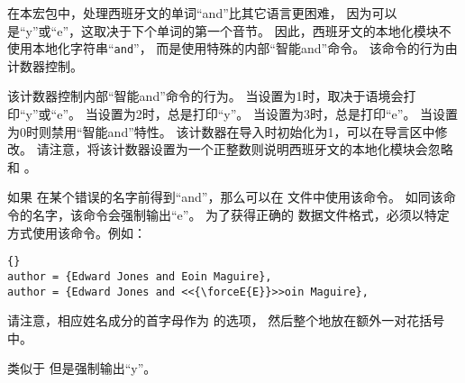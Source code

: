 
在本宏包中，处理西班牙文的单词“and”比其它语言更困难，
因为可以是“y”或“e”，这取决于下个单词的第一个音节。
因此，西班牙文的本地化模块不使用本地化字符串“\texttt{and}”，
而是使用特殊的内部“智能and”命令。
该命令的行为由  计数器控制。

\begin{ltxsyntax}



该计数器控制内部“智能and”命令的行为。
当设置为1时，取决于语境会打印“y”或“e”。
当设置为2时，总是打印“y”。
当设置为3时，总是打印“e”。
当设置为0时则禁用“智能and”特性。
该计数器在导入时初始化为1，可以在导言区中修改。
请注意，将该计数器设置为一个正整数则说明西班牙文的本地化模块会忽略  和 。



如果 \biblatex 在某个错误的名字前得到“and”，那么可以在  文件中使用该命令。
如同该命令的名字，该命令会强制输出“e”。
为了获得正确的 \BibTeX 数据文件格式，必须以特定方式使用该命令。例如：

\begin{lstlisting}[style=bibtex]{}
author = {Edward Jones and Eoin Maguire},
author = {Edward Jones and <<{\forceE{E}}>>oin Maguire},
\end{lstlisting}
%
请注意，相应姓名成分的首字母作为  的选项，
然后整个地放在额外一对花括号中。


类似于  但是强制输出“y”。

\end{ltxsyntax}

